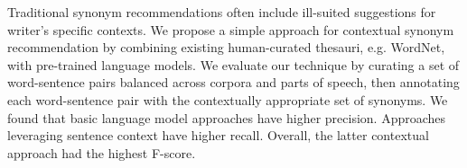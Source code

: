 Traditional synonym recommendations often include ill-suited suggestions for writer's specific contexts. We propose a simple approach for contextual synonym recommendation by combining existing human-curated thesauri, e.g. WordNet, with pre-trained language models. We evaluate our technique by curating a set of word-sentence pairs balanced across corpora and parts of speech, then annotating each word-sentence pair with the contextually appropriate set of synonyms. We found that basic language model approaches have higher precision. Approaches leveraging sentence context have higher recall. Overall, the latter contextual approach had the highest F-score.
